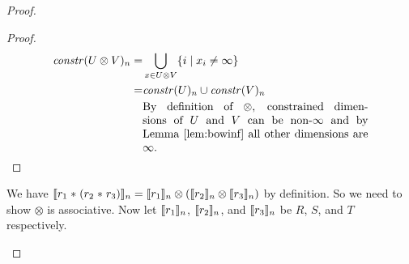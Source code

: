 \begin{proof}
\begin{description}
    \begin{proof}
      \begin{align}
        \effdims{U \otimes V}{n} = &
          \bigcup_{x \in U \otimes V} \{ i \;|\; x_i \neq \infty \} \\
        = & \effdims{U}{n} \cup \effdims{V}{n} \\
          & \parbox{7cm}{By definition of $\otimes$, constrained dimensions of 
                         $U$ and $V$ can be non-$\infty$ and by
                         Lemma~\ref{lem:bowinf} all other dimensions are
                         $\infty$.} \\
      \end{align}
    \end{proof}
%
    We have $\llbracket{r_1 \; \texttt{$\ast$} \;
    (r_2 \; \texttt{$\ast$} \; r_3)}\rrbracket_n = \llbracket{r_1}\rrbracket_n \otimes (\llbracket{r_2}\rrbracket_n
    \otimes \llbracket{r_3}\rrbracket_n)$ by definition. So we need to show $\otimes$ is
    associative. Now let $\llbracket{r_1}\rrbracket_n$, $\llbracket{r_2}\rrbracket_n$, and
    $\llbracket{r_3}\rrbracket_n$ be $R$, $S$, and $T$ respectively.


\end{description}
\end{proof}
